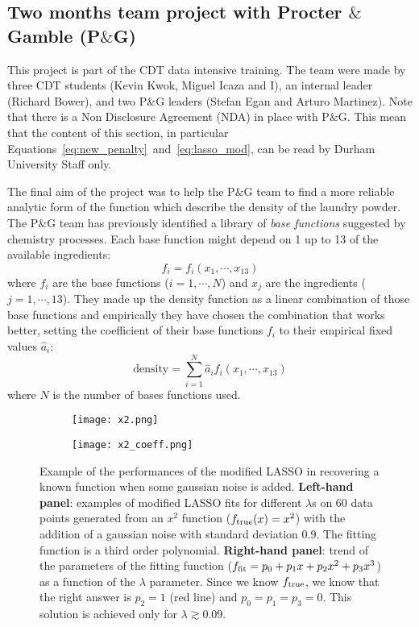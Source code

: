 \documentclass[11pt]{article}
\newcommand{\peg}{P$\&$G }
\begin{document}
\subsection{Two months team project with Procter $\&$ Gamble (P$\&$G)}
\label{sub:peg}

This project is part of the CDT data intensive training. The team were made by three CDT students (Kevin Kwok, Miguel Icaza and I), an internal leader (Richard Bower), and two \peg leaders (Stefan Egan and Arturo Martinez). Note that there is a Non Disclosure Agreement (NDA) in place with P$\&$G. This mean that the content of this section, in particular Equations~\ref{eq:new_penalty}~and~\ref{eq:lasso_mod}, can be read by Durham University Staff only.

The final aim of the project was to help the P$\&$G team to find a more reliable analytic form of the function which describe the density of the laundry powder. The \peg team has previously identified a library of \textit{base functions} suggested by chemistry processes. Each base function might depend on 1 up to 13 of the available ingredients: 
\begin{equation}
\label{eq:fi}
f_i = f_i(x_1, \cdots, x_{13})
\end{equation}
where $f_i$ are the base functions ($i=1,\cdots,N$) and $x_j$ are the ingredients ($j=1,\cdots,13$).
They made up the density function as a linear combination of those base functions and empirically they have chosen the combination that works better, setting the coefficient of their base functions $f_i$ to their empirical fixed values $\hat a_i$: 
\begin{equation}
\label{eq:density}
\text{density} = \sum_{i=1}^N \hat{a}_i f_i(x_1, \cdots, x_{13})
\end{equation}
where $N$ is the number of bases functions used.

%
\begin{figure}
\centering
\begin{subfigure}{.48\textwidth}
   \centering
   \texttt{[image: x2.png]}
\end{subfigure}\hfill%
\begin{subfigure}{.48\textwidth}
   \centering
   \texttt{[image: x2\_coeff.png]}
\end{subfigure}
\caption{Example of the performances of the modified LASSO in recovering a known function when some gaussian noise is added. \textbf{Left-hand panel}: examples of modified LASSO fits for different $\lambda$s on 60 data points generated from an $x^2$ function ($f_{\rm{true}}(x)=x^2$) with the addition of a gaussian noise with standard deviation 0.9. The fitting function is a third order polynomial. \textbf{Right-hand panel}: trend of the parameters of the fitting function ($f_{\rm{fit}}=p_0 + p_1 x + p_2 x^2 + p_3 x^3$) as a function of the $\lambda$ parameter. Since we know $f_{\rm{true}}$, we know that the right answer is $p_2=1$ (red line) and $p_0=p_1=p_3 =0$. This solution is achieved only for $\lambda \gtrsim 0.09$. }
\label{fig:LASSO}
\end{figure}
%
\end{document}
